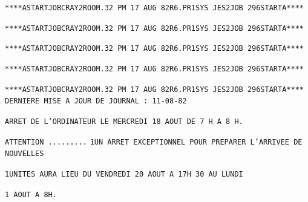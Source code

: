 \texttt{****A\quad START\quad JOB\quad CRAY2\qquad ROOM.32 PM 17 AUG 82\quad R6.PR1\quad SYS JES2\quad JOB 296\quad START\quad A****}\par
\texttt{****A\quad START\quad JOB\quad CRAY2\qquad ROOM.32 PM 17 AUG 82\quad R6.PR1\quad SYS JES2\quad JOB 296\quad START\quad A****}\par
\texttt{****A\quad START\quad JOB\quad CRAY2\qquad ROOM.32 PM 17 AUG 82\quad R6.PR1\quad SYS JES2\quad JOB 296\quad START\quad A****}\par
\texttt{****A\quad START\quad JOB\quad CRAY2\qquad ROOM.32 PM 17 AUG 82\quad R6.PR1\quad SYS JES2\quad JOB 296\quad START\quad A****}\par
\texttt{****A\quad START\quad JOB\quad CRAY2\qquad ROOM.32 PM 17 AUG 82\quad R6.PR1\quad SYS JES2\quad JOB 296\quad START\quad A****}
\texttt{DERNIERE MISE A JOUR DE JOURNAL : 11-08-82}\par
\texttt{ARRET DE L'ORDINATEUR LE MERCREDI 18 AOUT DE 7 H A 8 H.}\par
\texttt{ATTENTION .........}
\texttt{1\qquad UN ARRET EXCEPTIONNEL POUR PREPARER L'ARRIVEE DE NOUVELLES}\par
\texttt{1\qquad UNITES AURA LIEU DU VENDREDI 20 AOUT A 17H 30 AU LUNDI}\par
\texttt{1 AOUT A 8H.}
